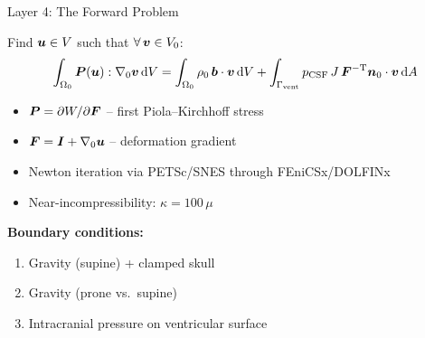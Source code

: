 \begin{frame}{Layer 4: The Forward Problem}

  Find $\bm{u} \in V$ such that $\forall\, \bm{v} \in V_0$:
  \[
    \int_{\Omega_0} \bm{P}(\bm{u}) : \nabla_0 \bm{v} \,\mathrm{d}V
    = \int_{\Omega_0} \rho_0 \,\bm{b} \cdot \bm{v} \,\mathrm{d}V
    + \int_{\Gamma_{\text{vent}}} p_{\text{CSF}} \,
      J\,\bm{F}^{-\mathrm{T}}\bm{n}_0 \cdot \bm{v} \,\mathrm{d}A
  \]

  \begin{itemize}
    \item $\bm{P} = \partial W / \partial \bm{F}$ -- first Piola--Kirchhoff
      stress
    \item $\bm{F} = \bm{I} + \nabla_0\bm{u}$ -- deformation gradient
    \item Newton iteration via PETSc/SNES through FEniCSx/DOLFINx
      \cite{Baratta2023}
    \item Near-incompressibility: $\kappa = 100\,\mu$
  \end{itemize}

  \bigskip

  \textbf{Boundary conditions:}
  \begin{enumerate}
    \item Gravity (supine) + clamped skull
    \item Gravity (prone vs.\ supine)
    \item Intracranial pressure on ventricular surface
  \end{enumerate}

\end{frame}

